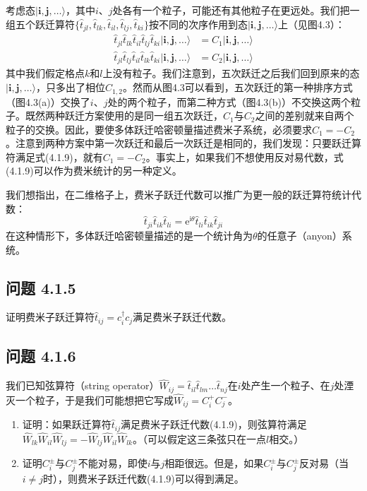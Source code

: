 考虑态$|\pmb{i},\pmb{j},\ldots\rangle$，其中$i$、$j$处各有一个粒子，可能还有其他粒子在更远处。我们把一组五个跃迁算符$\{\hat{t}_{jl},\hat{t}_{lk},\hat{t}_{il},\hat{t}_{lj},\hat{t}_{ki}\}$按不同的次序作用到态$|\pmb{i},\pmb{j},\ldots\rangle$上（见图4.3）：
\begin{align*}
\hat{t}_{jl}\hat{t}_{lk}\hat{t}_{il}\hat{t}_{lj}\hat{t}_{ki}|\pmb{i},\pmb{j},\ldots\rangle&=C_1|\pmb{i},\pmb{j},\ldots\rangle\\
\hat{t}_{jl}\hat{t}_{lj}\hat{t}_{il}\hat{t}_{lk}\hat{t}_{ki}|\pmb{i},\pmb{j},\ldots\rangle&=C_2|\pmb{i},\pmb{j},\ldots\rangle
\end{align*}
其中我们假定格点$k$和$l$上没有粒子。我们注意到，五次跃迁之后我们回到原来的态$|\pmb{i},\pmb{j},\ldots\rangle$，只多出了相位$C_{1,2}$。然而从图4.3可以看到，五次跃迁的第一种排序方式（图4.3(a)）交换了$i$、$j$处的两个粒子，而第二种方式（图4.3(b)）不交换这两个粒子。既然两种跃迁方案使用的是同一组五次跃迁，$C_1$与$C_2$之间的差别就来自两个粒子的交换。因此，要使多体跃迁哈密顿量描述费米子系统，必须要求$C_1=-C_2$。注意到两种方案中第一次跃迁和最后一次跃迁是相同的，我们发现：只要跃迁算符满足式(4.1.9)，就有$C_1=-C_2$。事实上，如果我们不想使用反对易代数，式(4.1.9)可以作为费米统计的另一种定义。

我们想指出，在二维格子上，费米子跃迁代数可以推广为更一般的跃迁算符统计代数：
\begin{equation*}
\hat{t}_{ji}\hat{t}_{ik}\hat{t}_{li}=\mathrm{e}^{\mathrm{i}\theta}\hat{t}_{li}\hat{t}_{ik}\hat{t}_{ji}\tag{4.1.10}
\end{equation*}
在这种情形下，多体跃迁哈密顿量描述的是一个统计角为$\theta$的任意子（anyon）系统。

\subsection*{问题 4.1.5}

证明费米子跃迁算符$\hat{t}_{ij}=c_{i}^{\dagger}c_{j}$满足费米子跃迁代数。

\subsection*{问题 4.1.6}

我们已知弦算符（string operator）$\hat{W}_{ij}=\hat{t}_{il}\hat{t}_{lm}\ldots\hat{t}_{nj}$在$i$处产生一个粒子、在$j$处湮灭一个粒子，于是我们可能想把它写成$\hat{W}_{ij}=C_{i}^{+}C_{j}^{-}$。

\begin{enumerate}
\item[(a)] 证明：如果跃迁算符$\hat{t}_{ij}$满足费米子跃迁代数(4.1.9)，则弦算符满足$\hat{W}_{lk}\hat{W}_{il}\allowbreak\hat{W}_{lj}\allowbreak=-\hat{W}_{lj}\allowbreak\hat{W}_{il}\allowbreak\hat{W}_{lk}$。（可以假定这三条弦只在一点$l$相交。）
\item[(b)] 证明$C_{i}^{\pm}$与$C_{j}^{\pm}$不能对易，即使$i$与$j$相距很远。但是，如果$C_{i}^{\pm}$与$C_{j}^{\pm}$反对易（当$i\neq j$时），则费米子跃迁代数(4.1.9)可以得到满足。
\end{enumerate}

